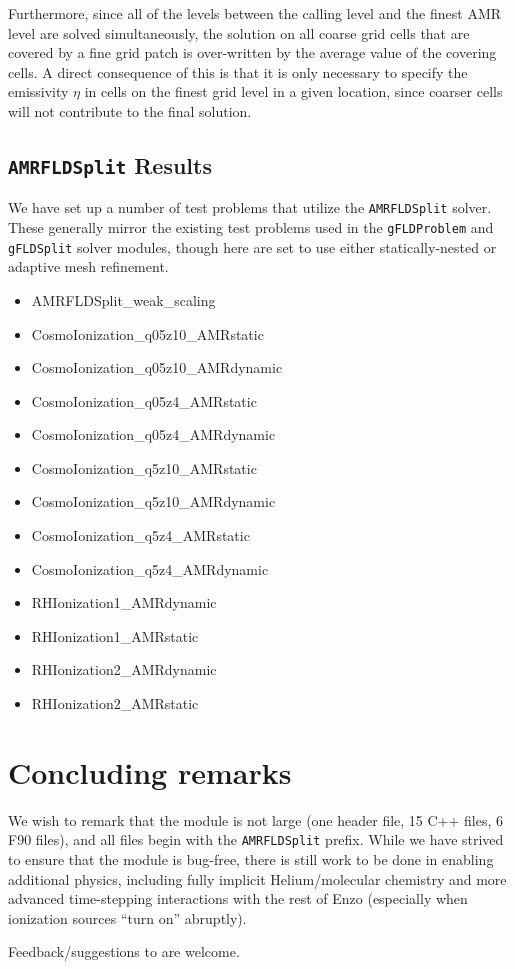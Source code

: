 \documentclass[letterpaper,10pt]{article}
\renewcommand{\(}{\left(}
\renewcommand{\)}{\right)}
\begin{document}
Furthermore, since all of the levels between the calling level and the
finest AMR level are solved simultaneously, the solution on all coarse
grid cells that are covered by a fine grid patch is over-written by
the average value of the covering cells.  A direct consequence of this
is that it is only necessary to specify the emissivity $\eta$ in cells
on the finest grid level in a given location, since coarser cells will
not contribute to the final solution.




\subsection{{\tt AMRFLDSplit} Results}
\label{sec:AMRFLDSplit_results}

We have set up a number of test problems that utilize the 
{\tt AMRFLDSplit} solver.  These generally mirror the existing test
problems used in the {\tt gFLDProblem} and {\tt gFLDSplit} solver
modules, though here are set to use either statically-nested or
adaptive mesh refinement.
\begin{itemize}
\item AMRFLDSplit\_weak\_scaling
\item CosmoIonization\_q05z10\_AMRstatic
\item CosmoIonization\_q05z10\_AMRdynamic
\item CosmoIonization\_q05z4\_AMRstatic
\item CosmoIonization\_q05z4\_AMRdynamic
\item CosmoIonization\_q5z10\_AMRstatic
\item CosmoIonization\_q5z10\_AMRdynamic
\item CosmoIonization\_q5z4\_AMRstatic
\item CosmoIonization\_q5z4\_AMRdynamic
\item RHIonization1\_AMRdynamic
\item RHIonization1\_AMRstatic
\item RHIonization2\_AMRdynamic
\item RHIonization2\_AMRstatic
\end{itemize}





\section{Concluding remarks}
\label{sec:conclusions}

We wish to remark that the module is not large (one header
file, 15 C++ files, 6 F90 files), and all files begin with the 
{\tt AMRFLDSplit} prefix.  While we have strived to ensure that the
module is bug-free, there is still work to be done in enabling
additional physics, including fully implicit Helium/molecular
chemistry and more advanced time-stepping interactions with the rest
of Enzo (especially when ionization sources ``turn on'' abruptly).  

Feedback/suggestions to are welcome.




\end{document}
